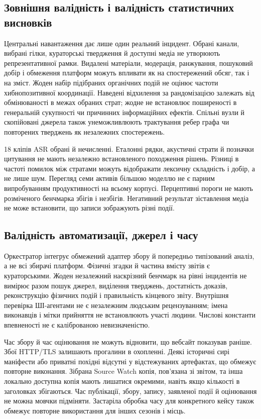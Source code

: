 \subsection{Зовнішня валідність і валідність статистичних висновків}
Центральні навантаження дає лише один реальний інцидент. Обрані канали, вибрані гілки, кураторські твердження й доступні медіа не утворюють репрезентативної рамки. Видалені матеріали, модерація, ранжування, пошуковий добір і обмеження платформ можуть впливати як на спостережений обсяг, так і на зміст. Жоден набір підібраних органічних подій не оцінює частоти хибнопозитивної координації. Наведені відхилення за рандомізацією залежать від обмінюваності в межах обраних страт; жодне не встановлює поширеності в генеральній сукупності чи причинних інформаційних ефектів. Спільні вузли й скопійовані джерела також унеможливлюють трактування ребер графа чи повторених тверджень як незалежних спостережень.

18 кліпів ASR обрані й нечисленні. Еталонні рядки, акустичні страти й позначки цитування не мають незалежно встановленого походження рішень. Різниці в частоті помилок між стратами можуть відображати лексичну складність і добір, а не лише шум. Перегляд семи активів більшою моделлю не є парним випробуванням продуктивності на всьому корпусі. Перцептивні пороги не мають розміченого бенчмарка збігів і незбігів. Негативний результат зіставлення медіа не може встановити, що записи зображують різні події.

\subsection{Валідність автоматизації, джерел і часу}
Оркестратор інтегрує обмежений адаптер збору й попередньо типізований аналіз, а не всі збирачі платформ. Фізичні згадки й частина вмісту звітів є кураторськими. Жоден незалежний наскрізний бенчмарк на рівні інцидентів не вимірює разом пошук джерел, виділення тверджень, достатність доказів, реконструкцію фізичних подій і правильність кінцевого звіту. Внутрішня перевірка ШІ-агентами не є незалежним людським рецензуванням; імена виконавців і мітки прийняття не встановлюють участі людини. Числові константи впевненості не є каліброваною невизначеністю.

Час збору й час оцінювання не можуть відновити, що вебсайт показував раніше. Збої HTTP/TLS залишають прогалини в охопленні. Деякі історичні сирі маніфести або приватні похідні відсутні у відстежуваних артефактах, що обмежує повторне виконання. Зібрана Source Watch копія, пов'язана зі звітом, та інша локально доступна копія мають лишатися окремими, навіть якщо кількості в заголовках збігаються. Час публікації, збору, запису, заявленої події й оцінювання не можна мовчки підміняти. Застаріла обробка часу для конкретного кейсу також обмежує повторне використання для інших сезонів і місць.

